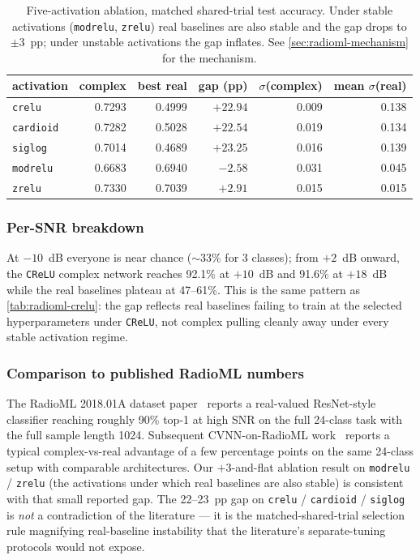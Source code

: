 \documentclass{article}
\providecommand{\Cref}[1]{\autoref{#1}}
\newcommand{\code}[1]{\texttt{#1}}
\begin{document}
\begin{table}[t]
  \centering
  \caption{Five-activation ablation, matched shared-trial test
    accuracy. Under stable activations (\code{modrelu}, \code{zrelu})
    real baselines are also stable and the gap drops to $\pm 3$~pp;
    under unstable activations the gap inflates. See
    \Cref{sec:radioml-mechanism} for the mechanism.}
  \label{tab:ablation-summary}
  \begin{tabular}{lrrrrr}
    \toprule
    activation & complex & best real & gap (pp) & $\sigma$(complex) & mean $\sigma$(real) \\
    \midrule
    \code{crelu} & 0.7293 & 0.4999 & $+22.94$ & 0.009 & 0.138 \\
    \code{cardioid} & 0.7282 & 0.5028 & $+22.54$ & 0.019 & 0.134 \\
    \code{siglog} & 0.7014 & 0.4689 & $+23.25$ & 0.016 & 0.139 \\
    \code{modrelu} & 0.6683 & 0.6940 & $-2.58$ & 0.031 & 0.045 \\
    \code{zrelu} & 0.7330 & 0.7039 & $+2.91$ & 0.015 & 0.015 \\
    \bottomrule
  \end{tabular}
\end{table}

\subsubsection{Per-SNR breakdown}

At $-10$~dB everyone is near chance ($\sim$33\% for 3 classes); from
$+2$~dB onward, the \code{CReLU} complex network reaches 92.1\% at
$+10$~dB and 91.6\% at $+18$~dB while the real baselines plateau at
47--61\%. This is the same pattern as \Cref{tab:radioml-crelu}: the
gap reflects real baselines failing to train at the selected
hyperparameters under \code{CReLU}, not complex pulling cleanly away
under every stable activation regime.

\subsubsection{Comparison to published RadioML numbers}

The RadioML 2018.01A dataset paper~\cite{oshea2018radioml} reports a
real-valued ResNet-style classifier reaching roughly 90\% top-1 at
high SNR on the full 24-class task with the full sample length 1024.
Subsequent CVNN-on-RadioML
work~\cite{krzyston2020complex,tu2020complex} reports a typical
complex-vs-real advantage of a few percentage points on the same
24-class setup with comparable architectures. Our $+3$-and-flat
ablation result on \code{modrelu} / \code{zrelu} (the activations under
which real baselines are also stable) is consistent with that small
reported gap. The 22--23~pp gap on \code{crelu} / \code{cardioid} /
\code{siglog} is \emph{not} a contradiction of the literature --- it
is the matched-shared-trial selection rule magnifying real-baseline
instability that the literature's separate-tuning protocols would not
expose.
\end{document}
